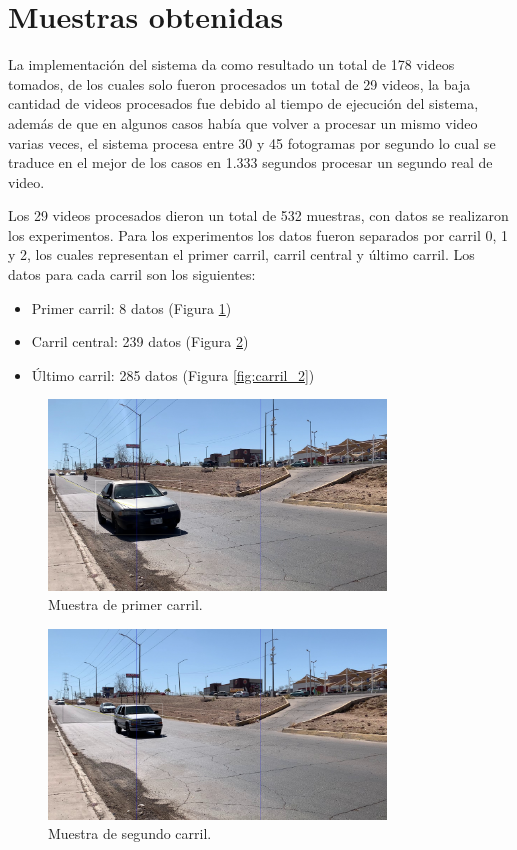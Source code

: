 \section{Muestras obtenidas}

La implementación del sistema da como resultado un total de 178 videos tomados, de los cuales solo fueron procesados un total de 29 videos, la baja cantidad de videos procesados fue debido al tiempo de ejecución del sistema, además de que en algunos casos había que volver a procesar un mismo video varias veces, el sistema procesa entre 30 y 45 fotogramas por segundo lo cual se traduce en el mejor de los casos en 1.333 segundos procesar un segundo real de video.

Los 29 videos procesados dieron un total de 532 muestras, con datos se realizaron los experimentos. Para los experimentos los datos fueron separados por carril 0, 1 y 2, los cuales representan el primer carril, carril central y último carril. Los datos para cada carril son los siguientes:

\begin{itemize}
    \item Primer carril: 8 datos (Figura \ref{fig:carril_0})
    \item Carril central: 239 datos (Figura \ref{fig:carril_1})
    \item Último carril: 285 datos (Figura \ref{fig:carril_2})
\end{itemize}

\begin{figure}[H]
    \centering
    \includegraphics[width=0.8\textwidth]{Resultados/imgs/carril_0.jpg}
    \caption{Muestra de primer carril.}
    \label{fig:carril_0}
\end{figure}

\begin{figure}[H]
    \centering
    \includegraphics[width=0.8\textwidth]{Resultados/imgs/carril_1.jpg}
    \caption{Muestra de segundo carril.}
    \label{fig:carril_1}
\end{figure}

